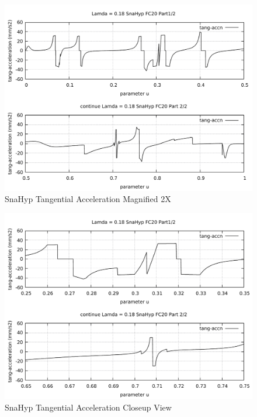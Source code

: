 \clearpage
\pagebreak
\begin{landscape}
	\begin{figure}
		\centering
		\caption  {SnaHyp Tangential Acceleration Magnified 2X}
		\label{img-SnaHyp Tangential Acceleration Magnified 2X}
		\includegraphics[width=1.30\textwidth]{Chap4/Lamda/magnify/SnaHyp-Tang-Accn-Lamda-magnified-01.pdf} 
	\end{figure}
\end{landscape}

\clearpage
\pagebreak
\begin{landscape}
	\begin{figure}
		\centering
		\caption  {SnaHyp Tangential Acceleration Closeup View}
		\label{img-SnaHyp Tangential Acceleration Closeup View}
		\includegraphics[width=1.30\textwidth]{Chap4/Lamda/magnify/SnaHyp-Tang-Accn-Lamda-magnified-02.pdf} 
	\end{figure}
\end{landscape}


